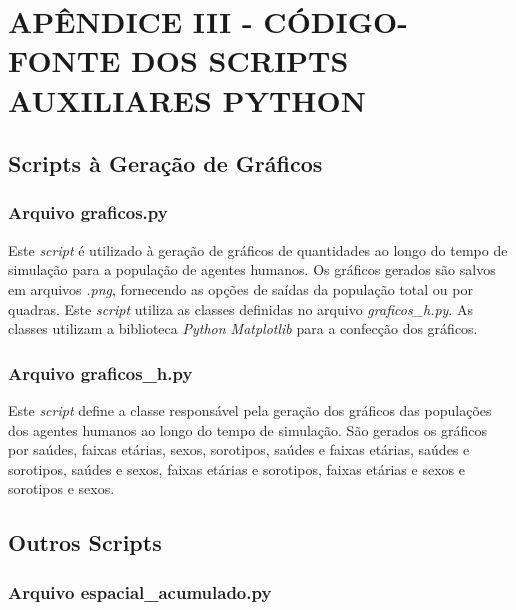 \section{APÊNDICE III - CÓDIGO-FONTE DOS SCRIPTS AUXILIARES PYTHON}

\subsection{Scripts à Geração de Gráficos} 

\subsubsection{Arquivo graficos.py}

Este \textit{script} é utilizado à geração de gráficos de quantidades ao longo do tempo de simulação para a população de agentes humanos. Os gráficos gerados são salvos em arquivos \textit{.png}, fornecendo as opções de saídas da população total ou por quadras. Este \textit{script} utiliza as classes definidas no arquivo \textit{graficos\_h.py}. As classes utilizam a biblioteca \textit{Python Matplotlib} para a confecção dos gráficos.



\newpage

\subsubsection{Arquivo graficos\_h.py}

Este \textit{script} define a classe responsável pela geração dos gráficos das populações dos agentes humanos ao longo do tempo de simulação. São gerados os gráficos por saúdes, faixas etárias, sexos, sorotipos, saúdes e faixas etárias, saúdes e sorotipos, saúdes e sexos, faixas etárias e sorotipos, faixas etárias e sexos e sorotipos e sexos.



\newpage

\subsection{Outros Scripts} 

\subsubsection{Arquivo espacial\_acumulado.py}

